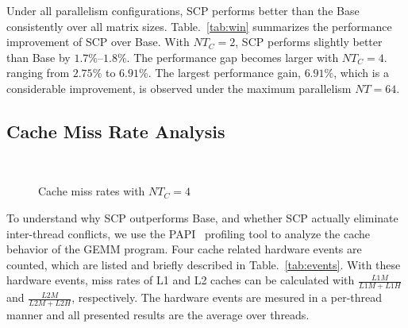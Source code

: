 Under all parallelism configurations, 
SCP performs better than the Base
consistently over all matrix sizes.
Table.~\ref{tab:win} summarizes the performance improvement of SCP over Base.
With $NT_C=2$, SCP performs slightly better than Base
by $1.7\%$--$1.8\%$.
The performance gap becomes larger with $NT_C=4$.
ranging from $2.75\%$ to $6.91\%$.
The largest performance gain, $6.91\%$, which is a considerable improvement,
is observed under the maximum parallelism $NT=64$.



\subsection{Cache Miss Rate Analysis}\label{subsec:analysis}

\begin{figure}
  \centering
  \\
  \caption{Cache miss rates with $NT_C=4$}
  \label{fig:papi}
\end{figure}

To understand why SCP outperforms Base,
and whether SCP actually eliminate inter-thread conflicts,
we use the PAPI~\cite{papi} profiling tool to
analyze the cache behavior of the GEMM program.
Four cache related hardware events are counted,
which are listed and briefly described in Table.~\ref{tab:events}.
With these hardware events,
miss rates of L1 and L2 caches can be calculated with
$\frac{L1M}{L1M+L1H}$ and $\frac{L2M}{L2M+L2H}$, respectively.
The hardware events are mesured in a per-thread manner
and all presented results are the average over threads.

